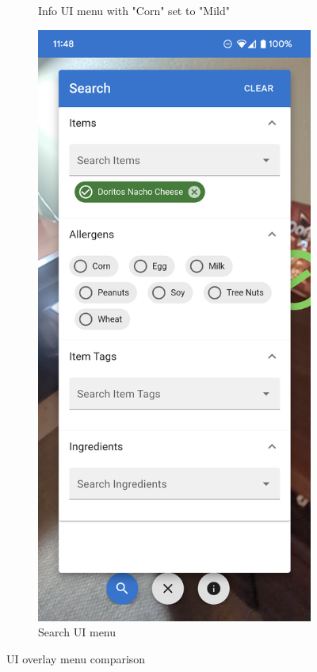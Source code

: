 \documentclass[thesis]{fputhesis}
\begin{document}
\begin{body}
\begin{figure}[h!]
\begin{subfigure}[]{0.45\textwidth}
        \caption{Info UI menu with "Corn" set to "Mild"}
        \label{fig:info-ui}
    \end{subfigure}
    \begin{subfigure}[]{0.45\textwidth}
        \includegraphics[width=\textwidth]{Images/search-ui.png}
        \caption{Search UI menu}
        \label{fig:search-ui}
    \end{subfigure}
    \caption{UI overlay menu comparison}
    \label{fig:mode-comparison}
\end{figure}


\end{body}
\end{document}
